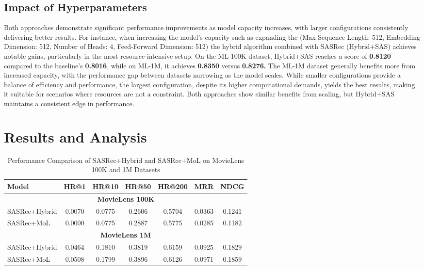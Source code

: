 \subsection{ Impact of Hyperparameters}
Both approaches demonstrate significant performance improvements as model capacity increases, with larger configurations consistently delivering better results. For instance, when increasing the model's capacity such as expanding the (Max Sequence Length: 512, Embedding Dimension: 512, Number of Heads: 4, Feed-Forward Dimension: 512) the hybrid algorithm combined with SASRec (Hybrid+SAS) achieves notable gains, particularly in the most resource-intensive setup. On the ML-100K dataset, Hybrid+SAS reaches a score of\textbf{ 0.8120} compared to the baseline's \textbf{0.8016}, while on ML-1M, it achieves \textbf{0.8350} versus \textbf{0.8276.} The ML-1M dataset generally benefits more from increased capacity, with the performance gap between datasets narrowing as the model scales. While smaller configurations provide a balance of efficiency and performance, the largest configuration, despite its higher computational demands, yields the best results, making it suitable for scenarios where resources are not a constraint. Both approaches show similar benefits from scaling, but Hybrid+SAS maintains a consistent edge in performance.

\section{Results and Analysis}
\begin{table}[h]
	\centering
	\large
	\renewcommand{\arraystretch}{1.3}
	\begin{tabular}{|l|c|c|c|c|c|c|}
		\hline
		\textbf{Model} & \textbf{HR@1} & \textbf{HR@10} & \textbf{HR@50} & \textbf{HR@200} & \textbf{MRR} & \textbf{NDCG} \\ \hline
		\multicolumn{7}{|c|}{\textbf{MovieLens 100K}} \\ \hline
		SASRec+Hybrid & 0.0070 & 0.0775 & 0.2606 & 0.5704 & 0.0363 & 0.1241 \\ \hline
		SASRec+MoL    & 0.0000 & 0.0775 & 0.2887 & 0.5775 & 0.0285 & 0.1182 \\ \hline
		\multicolumn{7}{|c|}{\textbf{MovieLens 1M}} \\ \hline
		SASRec+Hybrid & 0.0464 & 0.1810 & 0.3819 & 0.6159 & 0.0925 & 0.1829 \\ \hline
		SASRec+MoL    & 0.0508 & 0.1799 & 0.3896 & 0.6126 & 0.0971 & 0.1859 \\ \hline
	\end{tabular}
	\caption{Performance Comparison of SASRec+Hybrid and SASRec+MoL on MovieLens 100K and 1M Datasets}
	\label{tab:results_tab}
\end{table}
